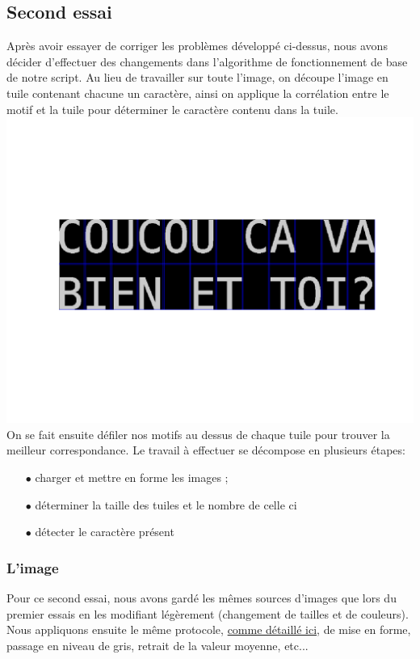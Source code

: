 \documentclass[a4paper,12pt,titlepage]{report}
\begin{document}
	\subsection{Second essai}
	\label{essai2}
	Après avoir essayer de corriger les problèmes développé ci-dessus, nous avons décider d'effectuer des changements dans l’algorithme de fonctionnement de base de notre script. Au lieu de travailler sur toute l'image, on découpe l'image en tuile contenant chacune un caractère, ainsi on applique la corrélation entre le motif et la tuile pour déterminer le caractère contenu dans la tuile.
	\includegraphics[scale=0.5]{../illus/tuiles.png}
	On se fait ensuite défiler nos motifs au dessus de chaque tuile pour trouver la meilleur correspondance.
	Le travail à effectuer se décompose en plusieurs étapes:
		\begin{itemize}
			\item[$\bullet$] charger et mettre en forme les images ;
			\item[$\bullet$] déterminer la taille des tuiles et le nombre de celle ci
			\item[$\bullet$] détecter le caractère présent
		\end{itemize}
	\subsubsection{L'image}
	Pour ce second essai, nous avons gardé les mêmes sources d'images que lors du premier essais en les modifiant légèrement (changement de tailles et de couleurs). Nous appliquons ensuite le même protocole, \hyperref[image]{comme détaillé ici}, de mise en forme, passage en niveau de gris, retrait de la valeur moyenne, etc... 
\end{document}
